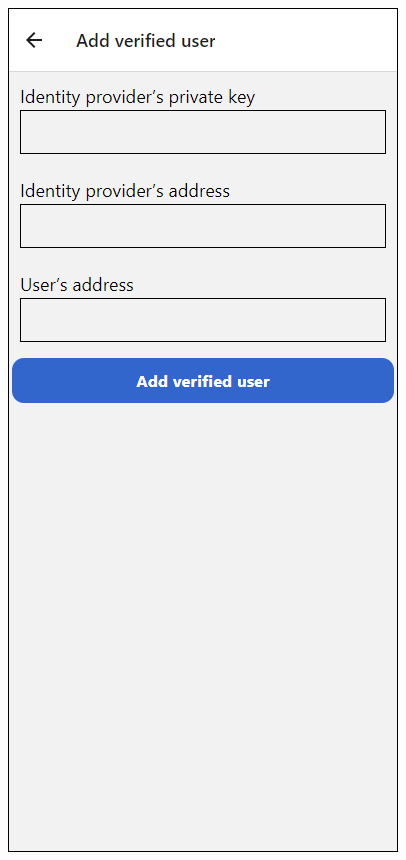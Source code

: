 \begin{figure}
\begin{minipage}{.5\textwidth}
  \label{fig:idp1}
\end{minipage}%
\begin{minipage}{.5\textwidth}
  \centering
  \includegraphics[width=.9\linewidth]{obrazky/idp2.png}
  \label{fig:idp2}
\end{minipage}
\end{figure}

